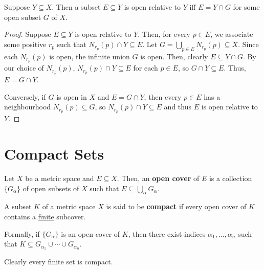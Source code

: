 \begin{theorem}
Suppose $Y \subseteq X$. Then a subset $E \subseteq Y$ is open relative to $Y$ iff $E = Y \cap G$ for some open subset $G$ of $X$. 

\begin{proof}
Suppose $E \subseteq Y$ is open relative to $Y$. Then, for every $p \in E$, we associate some positive $r_p$ such that $N_{r_p}(p) \cap Y \subseteq E$. Let $G = \bigcup_{p \in E} N_{r_p}(p) \subseteq X$. Since each $N_{r_p}(p)$ is open, the infinite union $G$ is open. Then, clearly $E \subseteq Y \cap G$. By our choice of $N_{r_p}(p)$, $N_{r_p}(p) \cap Y \subseteq E$ for each $p \in E$, so $G \cap Y \subseteq E$. Thus, $E = G \cap Y$. 

Conversely, if $G$ is open in $X$ and $E = G \cap Y$, then every $p \in E$ has a neighbourhood $N_{r_p}(p) \subseteq G$, so $N_{r_p}(p) \cap Y \subseteq E$ and thus $E$ is open relative to $Y$.
\end{proof}
\end{theorem}

\section{Compact Sets}

\begin{definition}
Let $X$ be a metric space and $E \subseteq X$. Then, an \textbf{open cover} of $E$ is a collection $\{G_\alpha\}$ of open subsets of $X$ such that $E \subseteq \bigcup_\alpha G_\alpha$. 
\end{definition}

\begin{definition}
A subset $K$ of a metric space $X$ is said to be \textbf{compact} if every open cover of $K$ contains a \underline{finite} subcover.

Formally, if $\{G_\alpha\}$ is an open cover of $K$, then there exist indices $\alpha_1, \dotsc, \alpha_n$ such that $K \subseteq G_{\alpha_1} \cup \dotsb \cup G_{\alpha_n}$. 

\end{definition}

Clearly every finite set is compact. 

